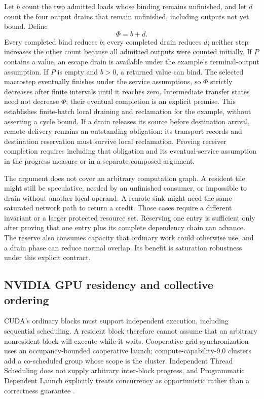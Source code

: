 Let $b$ count the two admitted loads whose binding remains unfinished, and let $d$ count the four output drains that remain unfinished, including outputs not yet bound. Define
\begin{equation}
 \Phi=b+d.
 \label{eq:u008-ranking}
\end{equation}
Every completed bind reduces $b$; every completed drain reduces $d$; neither step increases the other count because all admitted outputs were counted initially. If $P$ contains a value, an escape drain is available under the example's terminal-output assumption. If $P$ is empty and $b>0$, a returned value can bind. The selected macrostep eventually finishes under the service assumptions, so $\Phi$ strictly decreases after finite intervals until it reaches zero. Intermediate transfer states need not decrease $\Phi$; their eventual completion is an explicit premise. This establishes finite-batch local draining and reclamation for the example, without asserting a cycle bound. If a drain releases its source before destination arrival, remote delivery remains an outstanding obligation: its transport records and destination reservation must survive local reclamation. Proving receiver completion requires including that obligation and its eventual-service assumption in the progress measure or in a separate composed argument.

The argument does not cover an arbitrary computation graph. A resident tile might still be speculative, needed by an unfinished consumer, or impossible to drain without another local operand. A remote sink might need the same saturated network path to return a credit. Those cases require a different invariant or a larger protected resource set. Reserving one entry is sufficient only after proving that one entry plus its complete dependency chain can advance. The reserve also consumes capacity that ordinary work could otherwise use, and a drain phase can reduce normal overlap. Its benefit is saturation robustness under this explicit contract.

\subsection{NVIDIA GPU residency and collective ordering}

CUDA's ordinary blocks must support independent execution, including sequential scheduling. A resident block therefore cannot assume that an arbitrary nonresident block will execute while it waits. Cooperative grid synchronization uses an occupancy-bounded cooperative launch; compute-capability-9.0 clusters add a co-scheduled group whose scope is the cluster. Independent Thread Scheduling does not supply arbitrary inter-block progress, and Programmatic Dependent Launch explicitly treats concurrency as opportunistic rather than a correctness guarantee \citep{u008_cuda_guide}.

